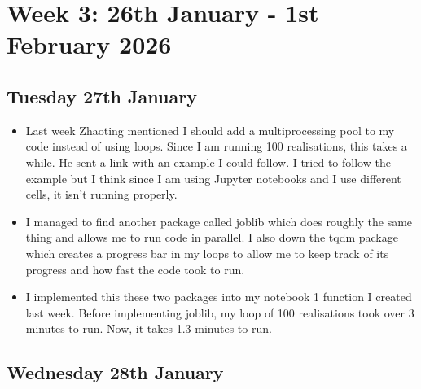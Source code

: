 \section{Week 3: 26th January - 1st February 2026}

\subsection{Tuesday 27th January}

\begin{itemize}
    \item Last week Zhaoting mentioned I should add a multiprocessing pool to my code instead of using loops. Since I am running 100 realisations, this takes a while. He sent a link with an example I could follow. I tried to follow the example but I think since I am using Jupyter notebooks and I use different cells, it isn't running properly.
    \item I managed to find another package called joblib which does roughly the same thing and allows me to run code in parallel. I also down the tqdm package which creates a progress bar in my loops to allow me to keep track of its progress and how fast the code took to run.
    \item I implemented this these two packages into my notebook 1 function I created last week. Before implementing joblib, my loop of 100 realisations took over 3 minutes to run. Now, it takes 1.3 minutes to run.
\end{itemize}

\subsection{Wednesday 28th January}

